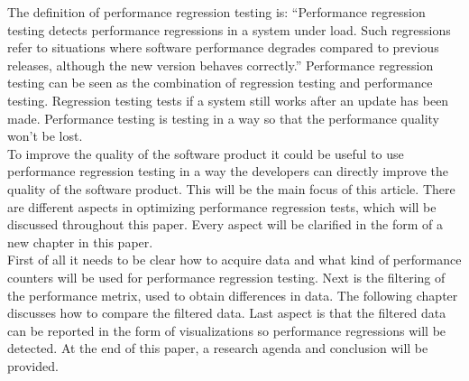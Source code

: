 The definition of performance regression testing is: ``Performance regression testing detects performance
regressions in a system under load. Such regressions refer to
situations where software performance degrades compared to
previous releases, although the new version behaves correctly.''\cite{foo2010mining}
Performance regression testing can be seen as the combination of regression testing and performance testing. Regression testing tests if a system still works after an update has been made. Performance testing is testing in a way so that the performance quality won't be lost. \\
To improve the quality of the software product it could be useful to use performance regression testing in a way the developers can
directly improve the quality of the software product. This will be the main focus of this article. There are different aspects in optimizing performance regression tests, which will be discussed throughout this paper. Every aspect will be clarified in the form of a new chapter in this paper. \\ First of all it needs to be clear how to acquire data and what kind of performance counters will be used for performance regression testing. Next is the filtering of the performance metrix, used to obtain differences in data. The following chapter discusses how to compare the filtered data. Last aspect is that the filtered data can be reported in the form of visualizations so performance regressions will be detected. At the end of this paper, a research agenda and conclusion will be provided.


